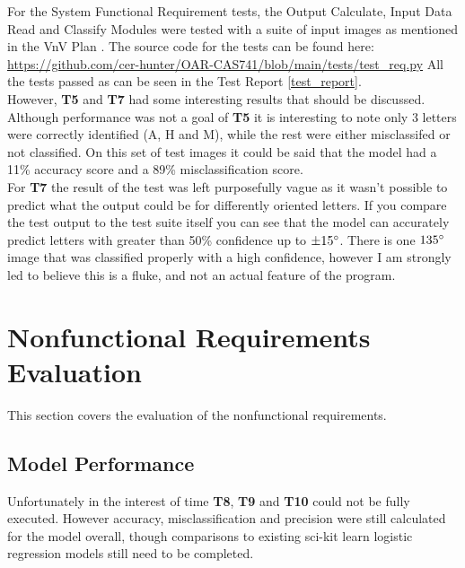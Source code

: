\documentclass[12pt, titlepage]{article}
\begin{document}
For the System Functional Requirement tests, the Output Calculate, Input Data Read and Classify Modules were tested
with a suite of input images as mentioned in the VnV Plan \citep{VnV_plan}. The source code for the tests can be found here:
\url{https://github.com/cer-hunter/OAR-CAS741/blob/main/tests/test_req.py}
All the tests passed as can be seen in the Test Report \ref{test_report}.\\
However, \textbf{T5} and \textbf{T7} had some interesting results that should be discussed.\\
Although performance was not a goal of \textbf{T5} it is interesting to note only 3 letters were correctly identified (A, H and M), while the
rest were either misclassifed or not classified. On this set of test images it could be said that the model had a 11\% accuracy score and a 89\% misclassification score. \\
For \textbf{T7} the result of the test was left purposefully vague as it wasn't possible to predict what the output could be for differently oriented letters.
If you compare the test output to the test suite itself you can see that the model can accurately predict letters with greater than 50\% confidence 
up to $\pm 15\degree$. There is one $135\degree$ image that was classified properly with a high confidence, however I am strongly led to believe
this is a fluke, and not an actual feature of the program.

\section{Nonfunctional Requirements Evaluation}

This section covers the evaluation of the nonfunctional requirements.
		
\subsection{Model Performance}

Unfortunately in the interest of time \textbf{T8}, \textbf{T9} and \textbf{T10} could not be fully executed. However
accuracy, misclassification and precision were still calculated for the model overall, though
comparisons to existing sci-kit learn logistic regression models still need to be completed.
\end{document}

